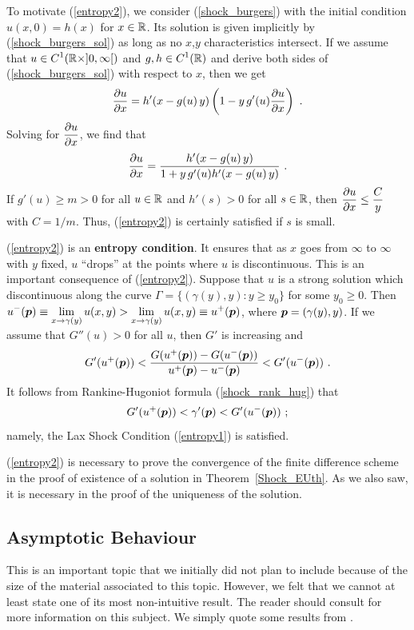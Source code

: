 To motivate (\ref{entropy2}), we consider (\ref{shock_burgers}) with the
initial condition $u(x,0) = h(x)$ for $x \in \mathbb{R}$.  Its solution is
given implicitly by (\ref{shock_burgers_sol}) as long as no $x$,$y$
characteristics intersect.  If we assume that
$\displaystyle u \in C^1(\mathbb{R}\times]0,\infty[)$ and
$\displaystyle g,h \in C^1(\mathbb{R})$ and derive both sides of
(\ref{shock_burgers_sol}) with respect to $x$, then we get
\[
\frac{\partial{u}}{\partial x} = h'(x-g(u)\,y) \left( 1 - y\,g'(u) \frac{\partial{u}}{\partial x}\right) \ .
\]
Solving for $\displaystyle \frac{\partial{u}}{\partial x}$, we find that
\[
\frac{\partial{u}}{\partial x} = \frac{h'(x-g(u)\,y)}{1 +y\, g'(u) h'(x-g(u)\,y)} \ .
\]
If $g'(u) \geq m > 0$ for all $u\in \mathbb{R}$ and $h'(s) > 0$ for all $s
\in \mathbb{R}$, then $\displaystyle \frac{\partial{u}}{\partial x} \leq \frac{C}{y}$
with $C = 1/m$.   Thus, (\ref{entropy2}) is certainly satisfied if $s$
is small.

(\ref{entropy2}) is an
{\bfseries entropy condition}.
It ensures that as $x$ goes from $\infty$ to $\infty$ with $y$ fixed, $u$
``drops'' at the points where $u$ is discontinuous.
This is an important consequence of (\ref{entropy2}).  Suppose that
$u$ is a strong solution which discontinuous along the curve
$\Gamma = \{ (\gamma(y),y) : y \geq y_0 \}$ for some $y_0\geq 0$.
Then
$\displaystyle u^-({\bm{p}}) \equiv \lim_{x\to \gamma(y)} u(x,y) >
\lim_{x\to \gamma(y)} u(x,y) \equiv u^+({\bm{p}})$, where
${\bm{p}} = (\gamma(y),y)$.  If we assume that $G''(u) > 0$
for all $u$, then $G'$ is increasing and
\[
G'(u^+({\bm{p}})) <
\frac{G(u^+({\bm{p}})) - G(u^-({\bm{p}}))}{u^+({\bm{p}}) - u^-({\bm{p}})}
< G'(u^-({\bm{p}})) \ .
\]
It follows from Rankine-Hugoniot formula (\ref{shock_rank_hug}) that
\[
G'(u^+({\bm{p}})) < \gamma'({\bm{p}}) < G'(u^-({\bm{p}})) \ ;
\]
namely, the Lax Shock Condition (\ref{entropy1}) is satisfied.

(\ref{entropy2}) is necessary to prove the convergence of the finite
difference scheme in the proof of existence of a solution in
Theorem~\ref{Shock_EUth}.  As we also saw, it is necessary in the
proof of the uniqueness of the solution.

\subsection{Asymptotic Behaviour}

This is an important topic that we initially did not plan to include
because of the size of the material associated to this topic.
However, we felt that we cannot at least state one of its most
non-intuitive result.  The reader should consult \cite{Lax2,Smo} for
more information on this subject.  We simply quote some results from
\cite{Lax2}.


